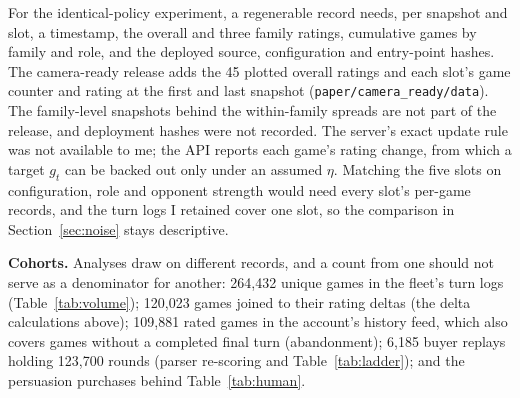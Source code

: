\documentclass{article}
\begin{document}
For the identical-policy experiment, a regenerable record needs, per snapshot
and slot, a timestamp, the overall and three family ratings, cumulative games by
family and role, and the deployed source, configuration and entry-point hashes.
The camera-ready release adds the 45 plotted overall ratings and each slot's game
counter and rating at the first and last snapshot
(\texttt{paper/camera\_ready/data}). The family-level snapshots behind the
within-family spreads are not part of the release, and deployment hashes were
not recorded. The server's exact update rule was not available to me; the API
reports each game's rating change, from which a target $g_t$ can be backed out
only under an assumed $\eta$. Matching the five slots on configuration, role and
opponent strength would need every slot's per-game records, and the turn logs I
retained cover one slot, so the comparison in Section~\ref{sec:noise} stays
descriptive.

\textbf{Cohorts.} Analyses draw on different records, and a count from one
should not serve as a denominator for another: 264,432 unique games in the
fleet's turn logs (Table~\ref{tab:volume}); 120,023 games joined to their rating
deltas (the delta calculations above); 109,881 rated games in the account's
history feed, which also covers games without a completed final turn
(abandonment); 6,185 buyer replays holding 123,700 rounds (parser re-scoring and
Table~\ref{tab:ladder}); and the persuasion purchases behind
Table~\ref{tab:human}.
\end{document}
